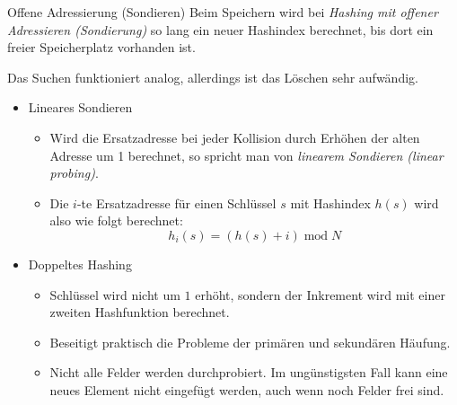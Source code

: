 \begin{defi}{Offene Adressierung (Sondieren)}
    Beim Speichern wird bei \emph{Hashing mit offener Adressieren (Sondierung)} so lang ein neuer Hashindex berechnet, bis dort ein freier Speicherplatz vorhanden ist.

    Das Suchen funktioniert analog, allerdings ist das Löschen sehr aufwändig.

    \begin{itemize}
        \item Lineares Sondieren
              \begin{itemize}
                  \item Wird die Ersatzadresse bei jeder Kollision durch Erhöhen der alten Adresse um 1 berechnet, so spricht man von \emph{linearem Sondieren (linear probing)}.
                  \item Die $i$-te Ersatzadresse für einen Schlüssel $s$ mit Hashindex $h(s)$ wird also wie folgt berechnet:
                        $$
                            h_i(s) = (h(s) + i) \operatorname{mod} N
                        $$
              \end{itemize}
        \item Doppeltes Hashing
              \begin{itemize}
                  \item Schlüssel wird nicht um $1$ erhöht, sondern der Inkrement wird mit einer zweiten Hashfunktion berechnet.
                  \item Beseitigt praktisch die Probleme der primären und sekundären Häufung.
                  \item Nicht alle Felder werden durchprobiert. Im ungünstigsten Fall kann eine neues Element nicht eingefügt werden, auch wenn noch Felder frei sind.
              \end{itemize}
    \end{itemize}
\end{defi}

